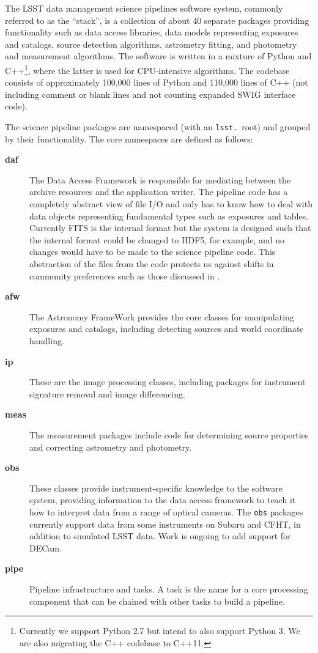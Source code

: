 \documentclass[11pt,twoside]{article}
\begin{document}
The LSST data management science pipelines software system, commonly
referred to as the ``stack'', is a collection of about 40 separate
packages providing functionality such as data access libraries, data
models representing exposures and catalogs, source detection
algorithms, astrometry fitting, and photometry and measurement
algorithms. The software is written in a mixture of Python and
C++\footnote{Currently we support Python 2.7 but intend to also
  support Python 3. We are also migrating the C++ codebase to C++11.},
where the latter is used for CPU-intensive algorithms. The codebase
consists of approximately 100,000 lines of Python and 110,000 lines of
C++ (not including comment or blank lines and not counting expanded
SWIG \citep[see e.g.][]{beazley2003automated} interface code).

The science pipeline packages are namespaced (with an \texttt{lsst.}\
root) and grouped by their functionality. The core namespaces are
defined as follows:

\begin{description}
\item[\textbf{daf}] The Data Access Framework is responsible for
  mediating between the archive resources and the application
  writer. The pipeline code has a completely abstract view of
  file I/O and only has to know how to deal with data objects
  representing fundamental types such as exposures and
  tables. Currently FITS is the internal format but the system is
  designed such that the internal format could be changed to HDF5, for
  example, and no changes would have to be made to the science
  pipeline code. This abstraction of the files from the code protects
  us against shifts in community preferences such as those discussed
  in \citet{2015ASPC..495...11M}.

\item[\textbf{afw}] The Astronomy FrameWork provides the
  core classes for manipulating exposures and catalogs, including
  detecting sources and world coordinate handling.

\item[\textbf{ip}] These are the image processing classes, including
  packages for instrument signature removal and image differencing.

\item[\textbf{meas}] The measurement packages include code for
  determining source properties and correcting astrometry and photometry.

\item[\textbf{obs}] These classes provide instrument-specific
  knowledge to the software system, providing information to the data
  access framework to teach it how to interpret data from a range of
  optical cameras. The \texttt{obs} packages currently support data
  from some instruments on Subaru and CFHT, in addition to simulated
  LSST data. Work is ongoing to add support for DECam.

\item[\textbf{pipe}] Pipeline infrastructure and tasks. A task is the
  name for a core processing component that can be chained with other
  tasks to build a pipeline.

\end{description}
\end{document}
